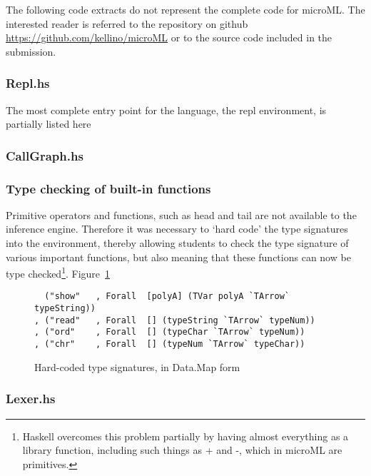 The following code extracts do not represent the complete code for microML. The interested reader is
referred to the repository on github \url{https://github.com/kellino/microML} or to the source code
included in the submission.

\subsubsection{Repl.hs}
The most complete entry point for the language, the repl environment, is partially listed here


\subsubsection{CallGraph.hs}


\subsubsection{Type checking of built-in functions}
Primitive operators and functions, such as head and tail are not available to the inference engine.
Therefore it was necessary to `hard code' the type signatures into the environment, thereby allowing
students to check the type signature of various important functions, but also meaning that these
functions can now be type checked\footnote{Haskell overcomes this problem partially by having almost
everything as a library function, including such things as + and -, which in microML are
primitives.}. Figure~\ref{fig:typesigs}

\begin{figure}[H]
    \begin{verbatim}
  ("show"   , Forall  [polyA] (TVar polyA `TArrow` typeString))
, ("read"   , Forall  [] (typeString `TArrow` typeNum))
, ("ord"    , Forall  [] (typeChar `TArrow` typeNum))
, ("chr"    , Forall  [] (typeNum `TArrow` typeChar))
    \end{verbatim}
    \caption{Hard-coded type signatures, in Data.Map form}
\label{fig:typesigs}
\end{figure}

\subsubsection{Lexer.hs}


